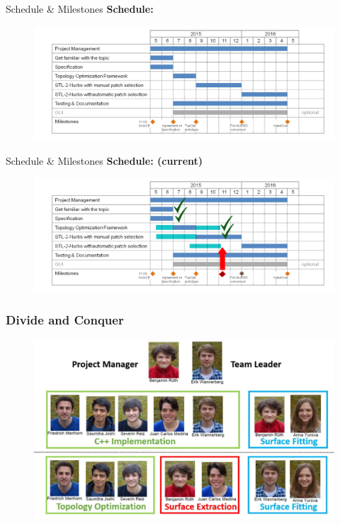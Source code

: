 \begin{frame}{Schedule \& Milestones}
\textbf{Schedule:}
\begin{figure}
\includegraphics[width=1.0\linewidth]{Pictures/Schedule/schedule.png}
\end{figure}
\end{frame}

\begin{frame}{Schedule \& Milestones}
\textbf{Schedule: (current)}
\begin{figure}
\includegraphics[width=1.0\linewidth]{Pictures/Schedule/schedule_new.png}
\end{figure}
\end{frame}

\begin{frame}

	\frametitle{Divide and Conquer}

	\begin{figure}
	\includegraphics[scale=0.32]{Pictures/DC/organization.pdf}
	\end{figure}
	
\end{frame}


